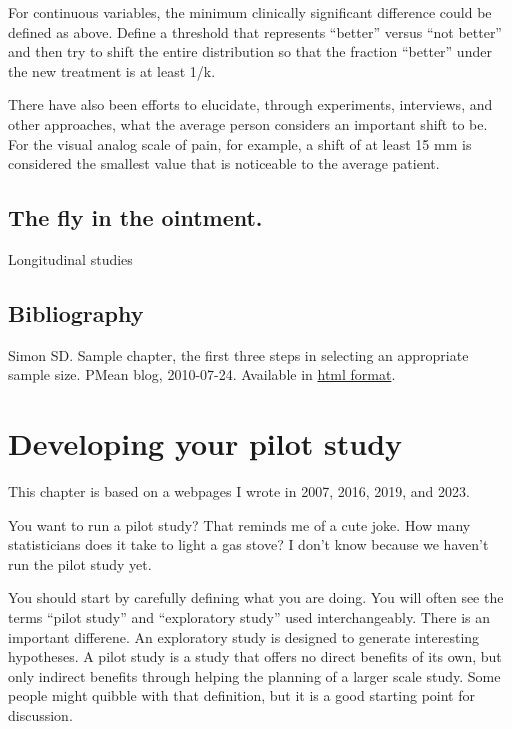 \documentclass[
  letterpaper,
  DIV=11,
  numbers=noendperiod]{scrreprt}
\begin{document}
For continuous variables, the minimum clinically significant difference
could be defined as above. Define a threshold that represents ``better''
versus ``not better'' and then try to shift the entire distribution so
that the fraction ``better'' under the new treatment is at least 1/k.

There have also been efforts to elucidate, through experiments,
interviews, and other approaches, what the average person considers an
important shift to be. For the visual analog scale of pain, for example,
a shift of at least 15 mm is considered the smallest value that is
noticeable to the average patient.

\section{The fly in the ointment.}\label{the-fly-in-the-ointment.}

Longitudinal studies

\section{Bibliography}\label{bibliography-4}

Simon SD. Sample chapter, the first three steps in selecting an
appropriate sample size. PMean blog, 2010-07-24. Available in
\href{http://www.new.pmean.com/chapter-sample-size/}{html format}.


\chapter{Developing your pilot study}\label{developing-your-pilot-study}

This chapter is based on a webpages I wrote in 2007, 2016, 2019, and
2023.

You want to run a pilot study? That reminds me of a cute joke. How many
statisticians does it take to light a gas stove? I don't know because we
haven't run the pilot study yet.

You should start by carefully defining what you are doing. You will
often see the terms ``pilot study'' and ``exploratory study'' used
interchangeably. There is an important differene. An exploratory study
is designed to generate interesting hypotheses. A pilot study is a study
that offers no direct benefits of its own, but only indirect benefits
through helping the planning of a larger scale study. Some people might
quibble with that definition, but it is a good starting point for
discussion.
\end{document}

